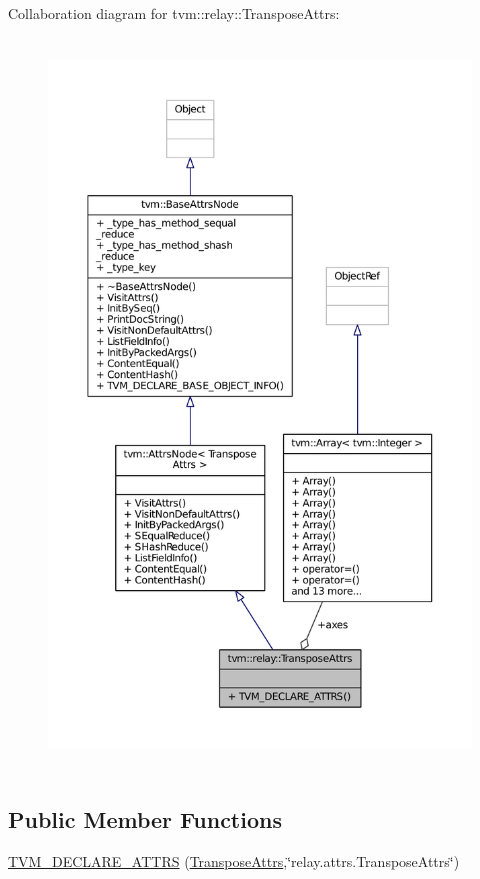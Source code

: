 Collaboration diagram for tvm\+:\+:relay\+:\+:Transpose\+Attrs\+:
\nopagebreak
\begin{figure}[H]
\begin{center}
\leavevmode
\includegraphics[height=550pt]{structtvm_1_1relay_1_1TransposeAttrs__coll__graph}
\end{center}
\end{figure}
\subsection*{Public Member Functions}
\begin{DoxyCompactItemize}
\item 
\hyperlink{structtvm_1_1relay_1_1TransposeAttrs_a19f1372f9f3c5dbdc5ce5c0efc42d08b}{T\+V\+M\+\_\+\+D\+E\+C\+L\+A\+R\+E\+\_\+\+A\+T\+T\+RS} (\hyperlink{structtvm_1_1relay_1_1TransposeAttrs}{Transpose\+Attrs},\char`\"{}relay.\+attrs.\+Transpose\+Attrs\char`\"{})
\end{DoxyCompactItemize}
